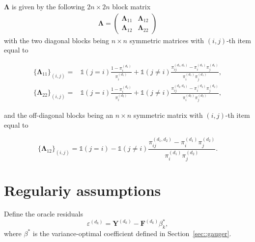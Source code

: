 \documentclass[twoside,letterpaper]{article}
\newcommand{\mathbbm}[1]{\mathds{#1}}
\theoremstyle{plain}
\theoremstyle{definition}
\theoremstyle{remark}
\newcommand{\bY}{\boldsymbol{Y}}
\newcommand{\bF}{\boldsymbol{F}}
\newcommand{\bLambda}{\boldsymbol{\Lambda}}
\newcommand{\indicator}{\mathbbm{1}}
\begin{document}
$\bLambda$ is given by the following $2n\times 2n$ block matrix
\begin{align}\label{eq::bLambda}
    \bLambda =
    \begin{pmatrix}
        \bLambda_{11} & \bLambda_{12} \\
        \bLambda_{12} & \bLambda_{22}
    \end{pmatrix}
\end{align}
with the two diagonal blocks being $n\times n$ symmetric matrices with $(i,j)$-th item equal to

\begin{align*}
    \{\bLambda_{11}\}_{(i,j)} =& \indicator(j=i) \frac{1-\pi_i^{(d_1)}}{\pi_i^{(d_1)}} 
    + \indicator(j\neq i)\frac{\pi_{ij}^{(d_1,d_1)}-\pi_i^{(d_1)}\pi_j^{(d_1)}}{\pi_i^{(d_1)}\pi_j^{(d_1)}}, \\
    \{\bLambda_{22}\}_{(i,j)} =& \indicator(j=i) \frac{1-\pi_i^{(d_2)}}{\pi_i^{(d_2)}} 
    + \indicator(j\neq i)\frac{\pi_{ij}^{(d_2,d_2)}-\pi_i^{(d_2)}\pi_j^{(d_2)}}{\pi_i^{(d_2)}\pi_j^{(d_2)}},
\end{align*}

and the off-diagonal blocks being an $n\times n$ symmetric matrix with $(i,j)$-th item equal to

$$
    \{\bLambda_{12}\}_{(i,j)} =\indicator{(j=i)} 
    - \indicator{(j\neq i)}\frac{\pi_{ij}^{(d_1,d_2)}-\pi_i^{(d_1)}\pi_j^{(d_2)}}{\pi_i^{(d_1)}\pi_j^{(d_2)}}.
$$
\section{Regulariy assumptions}\label{sec:regularity-condition}
 Define the oracle residuals
\[
\varepsilon^{(d_k)} = \bY^{(d_k)} - \bF^{(d_k)} \beta_k^*,
\]
where $\beta^*$ is the variance-optimal coefficient defined in Section~\ref{sec::gauger}.
\end{document}

